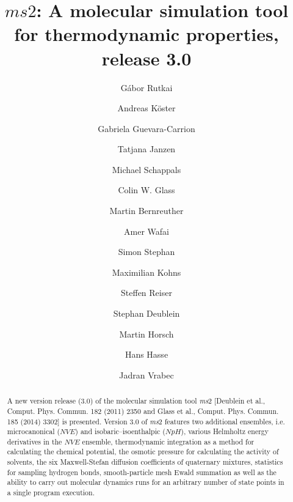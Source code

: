 \documentclass[preprint,12pt]{elsarticle}
\begin{document}
\begin{frontmatter}



\title{$ms2$: A molecular simulation tool for thermodynamic properties, release 3.0}


\author[upb]{G\'{a}bor Rutkai}
\author[upb]{Andreas K\"{o}ster}
\author[upb]{Gabriela Guevara-Carrion}
\author[upb]{Tatjana Janzen}
\author[ltd]{Michael Schappals}
\author[hlrs]{Colin W. Glass}
\author[hlrs]{Martin Bernreuther}
\author[hlrs]{Amer Wafai}
\author[ltd]{Simon Stephan}
\author[ltd]{Maximilian Kohns}
\author[ltd]{Steffen Reiser}
\author[ltd]{Stephan Deublein} 
\author[ltd]{Martin Horsch}
\author[ltd]{Hans Hasse}
\author[upb]{Jadran Vrabec}

\address[upb]{Lehrstuhl f\"{u}r Thermodynamik und Energietechnik, Universit\"{a}t Paderborn, 33098~Paderborn, Germany}
\address[ltd]{Lehrstuhl f\"{u}r Thermodynamik, Universit\"{a}t Kaiserslautern, 67653 Kaiserslautern, Germany}
\address[hlrs]{H\"{o}chstleistungsrechenzentrum Universit\"{a}t Stuttgart (HLRS), 70550 Stuttgart, Germany}


\begin{abstract}
A new version release (3.0) of the molecular simulation tool {\it ms}2 [Deublein et al., Comput. Phys. Commun. 182 (2011) 2350 and Glass et al., Comput. Phys. Commun. 185 (2014) 3302] is presented. Version 3.0 of {\it ms}2 features two additional ensembles, i.e. microcanonical ($NVE$) and isobaric–isoenthalpic ($NpH$), various Helmholtz energy derivatives in the $NVE$ ensemble, thermodynamic integration as a method for calculating the chemical potential, the osmotic pressure for calculating the activity of solvents, the six Maxwell-Stefan diffusion coefficients of quaternary mixtures, statistics for sampling hydrogen bonds, smooth-particle mesh Ewald summation as well as the ability to carry out molecular dynamics runs for an arbitrary number of state points in a single program execution.


\end{abstract}
\end{frontmatter}
\end{document}
